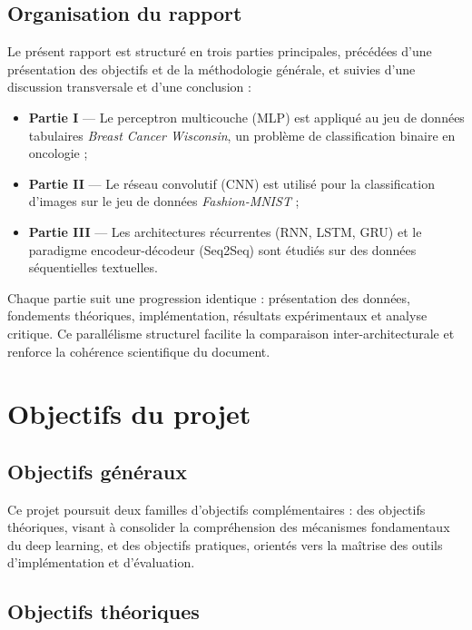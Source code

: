 \documentclass[11pt,a4paper]{article}
\begin{document}
\subsection{Organisation du rapport}

Le présent rapport est structuré en trois parties principales, précédées d'une
présentation des objectifs et de la méthodologie générale, et suivies d'une discussion
transversale et d'une conclusion :

\begin{itemize}
  \item \textbf{Partie I} — Le perceptron multicouche (MLP) est appliqué au jeu de données
        tabulaires \textit{Breast Cancer Wisconsin}, un problème de classification binaire
        en oncologie ;
  \item \textbf{Partie II} — Le réseau convolutif (CNN) est utilisé pour la classification
        d'images sur le jeu de données \textit{Fashion-MNIST} ;
  \item \textbf{Partie III} — Les architectures récurrentes (RNN, LSTM, GRU) et le paradigme
        encodeur-décodeur (Seq2Seq) sont étudiés sur des données séquentielles textuelles.
\end{itemize}

Chaque partie suit une progression identique : présentation des données, fondements
théoriques, implémentation, résultats expérimentaux et analyse critique. Ce parallélisme
structurel facilite la comparaison inter-architecturale et renforce la cohérence
scientifique du document.

\section{Objectifs du projet}

\subsection{Objectifs généraux}

Ce projet poursuit deux familles d'objectifs complémentaires : des objectifs théoriques,
visant à consolider la compréhension des mécanismes fondamentaux du deep learning, et
des objectifs pratiques, orientés vers la maîtrise des outils d'implémentation et
d'évaluation.

\subsection{Objectifs théoriques}
\end{document}
